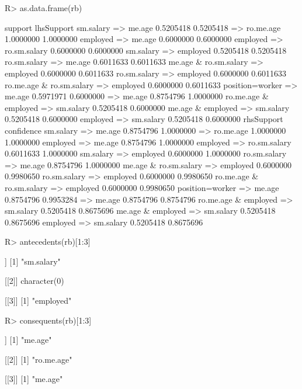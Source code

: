 \documentclass{article}\usepackage[]{graphicx}\usepackage[]{color}
\begin{document}
\begin{Schunk}
% --begin: "searchrules3"
\begin{Sinput}
R> as.data.frame(rb)
\end{Sinput}
\begin{Soutput}
                                       support lhsSupport
sm.salary => me.age                  0.5205418  0.5205418
 => ro.me.age                        1.0000000  1.0000000
employed => me.age                   0.6000000  0.6000000
employed => ro.sm.salary             0.6000000  0.6000000
sm.salary => employed                0.5205418  0.5205418
ro.sm.salary => me.age               0.6011633  0.6011633
me.age & ro.sm.salary => employed    0.6000000  0.6011633
ro.sm.salary => employed             0.6000000  0.6011633
ro.me.age & ro.sm.salary => employed 0.6000000  0.6011633
position=worker => me.age            0.5971971  0.6000000
 => me.age                           0.8754796  1.0000000
ro.me.age & employed => sm.salary    0.5205418  0.6000000
me.age & employed => sm.salary       0.5205418  0.6000000
employed => sm.salary                0.5205418  0.6000000
                                     rhsSupport confidence
sm.salary => me.age                   0.8754796  1.0000000
 => ro.me.age                         1.0000000  1.0000000
employed => me.age                    0.8754796  1.0000000
employed => ro.sm.salary              0.6011633  1.0000000
sm.salary => employed                 0.6000000  1.0000000
ro.sm.salary => me.age                0.8754796  1.0000000
me.age & ro.sm.salary => employed     0.6000000  0.9980650
ro.sm.salary => employed              0.6000000  0.9980650
ro.me.age & ro.sm.salary => employed  0.6000000  0.9980650
position=worker => me.age             0.8754796  0.9953284
 => me.age                            0.8754796  0.8754796
ro.me.age & employed => sm.salary     0.5205418  0.8675696
me.age & employed => sm.salary        0.5205418  0.8675696
employed => sm.salary                 0.5205418  0.8675696
\end{Soutput}
%
% --end: "searchrules3"
\end{Schunk}

\begin{Schunk}
% --begin: "searchrules4"
\begin{Sinput}
R> antecedents(rb)[1:3]
\end{Sinput}
\begin{Soutput}
[[1]]
[1] "sm.salary"

[[2]]
character(0)

[[3]]
[1] "employed"
\end{Soutput}
\begin{Sinput}
R> consequents(rb)[1:3]
\end{Sinput}
\begin{Soutput}
[[1]]
[1] "me.age"

[[2]]
[1] "ro.me.age"

[[3]]
[1] "me.age"
\end{Soutput}
%
% --end: "searchrules4"
\end{Schunk}
\end{document}
